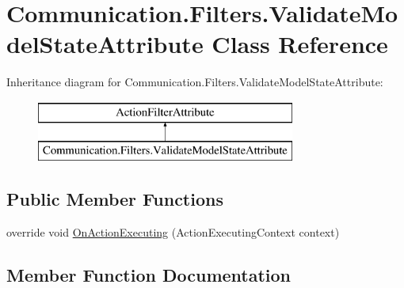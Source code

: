 \hypertarget{class_communication_1_1_filters_1_1_validate_model_state_attribute}{}\section{Communication.\+Filters.\+Validate\+Model\+State\+Attribute Class Reference}
\label{class_communication_1_1_filters_1_1_validate_model_state_attribute}
Inheritance diagram for Communication.\+Filters.\+Validate\+Model\+State\+Attribute\+:\begin{figure}[H]
\begin{center}
\leavevmode
\includegraphics[height=2.000000cm]{class_communication_1_1_filters_1_1_validate_model_state_attribute}
\end{center}
\end{figure}
\subsection*{Public Member Functions}
\begin{DoxyCompactItemize}
\item 
override void \mbox{\hyperlink{class_communication_1_1_filters_1_1_validate_model_state_attribute_a785e43025a598082a88cb8a1ec43173b}{On\+Action\+Executing}} (Action\+Executing\+Context context)
\end{DoxyCompactItemize}


\subsection{Member Function Documentation}
\mbox{\label{class_communication_1_1_filters_1_1_validate_model_state_attribute_a785e43025a598082a88cb8a1ec43173b}} 

